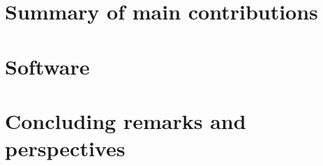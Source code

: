 \chapter{Summary of main contributions}

\chapter{Software}

\chapter{Concluding remarks and perspectives}\label{chap:conclusion}



